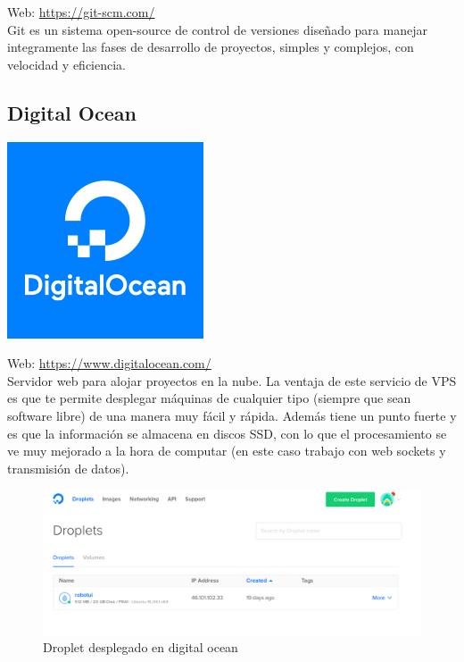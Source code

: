 Web: \url{https://git-scm.com/}\\

Git es un sistema open-source de control de versiones diseñado para manejar integramente las fases de desarrollo de proyectos, simples y complejos, con velocidad y eficiencia.\\

\subsection{Digital Ocean}

\begin{center}\includegraphics[scale=0.35]{imagenes/docean-logo.png}\end{center}

Web: \url{https://www.digitalocean.com/}\\

Servidor web para alojar proyectos en la nube. La ventaja de este servicio de VPS es que te permite desplegar máquinas de cualquier tipo (siempre que sean software libre) de una manera muy fácil y rápida. Además tiene un punto fuerte y es que la información se almacena en discos SSD, con lo que el procesamiento se ve muy mejorado a la hora de computar (en este caso trabajo con web sockets y transmisión de datos).\\

\begin{figure}[H]
\begin{center}
\includegraphics[scale=0.45]{imagenes/droplets.png}
\caption{Droplet desplegado en digital ocean}
\end{center}
\end{figure}


